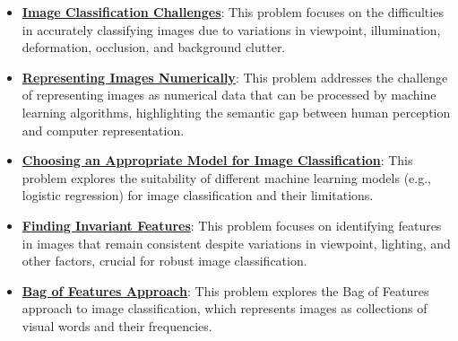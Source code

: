 \documentclass{article}%
\begin{document}
\begin{itemize}[leftmargin=*]%
\item \href{https://purdue.brightspace.com/d2l/common/assets/pdfjs-d2l-dist/1.0.14-legacy/web/viewer.html?file=\%2Fcontent\%2Fenforced\%2F1095467-wl.202510.CS.24300.001\%2F07L2-Vision.pdf\%3Fou\%3D1095467\&lang=en-us\&container=d2l-fileviewer-rendered-pdf\&fullscreen=d2l-fileviewer-rendered-pdf-dialog\&height=667#page=4}{\textbf{Image Classification Challenges}}: This problem focuses on the difficulties in accurately classifying images due to variations in viewpoint, illumination, deformation, occlusion, and background clutter.%
\item \href{https://purdue.brightspace.com/d2l/common/assets/pdfjs-d2l-dist/1.0.14-legacy/web/viewer.html?file=\%2Fcontent\%2Fenforced\%2F1095467-wl.202510.CS.24300.001\%2F07L2-Vision.pdf\%3Fou\%3D1095467\&lang=en-us\&container=d2l-fileviewer-rendered-pdf\&fullscreen=d2l-fileviewer-rendered-pdf-dialog\&height=667#page=4}{\textbf{Representing Images Numerically}}: This problem addresses the challenge of representing images as numerical data that can be processed by machine learning algorithms, highlighting the semantic gap between human perception and computer representation.%
\item \href{https://purdue.brightspace.com/d2l/common/assets/pdfjs-d2l-dist/1.0.14-legacy/web/viewer.html?file=\%2Fcontent\%2Fenforced\%2F1095467-wl.202510.CS.24300.001\%2F07L2-Vision.pdf\%3Fou\%3D1095467\&lang=en-us\&container=d2l-fileviewer-rendered-pdf\&fullscreen=d2l-fileviewer-rendered-pdf-dialog\&height=667#page=5}{\textbf{Choosing an Appropriate Model for Image Classification}}: This problem explores the suitability of different machine learning models (e.g., logistic regression) for image classification and their limitations.%
\item \href{https://purdue.brightspace.com/d2l/common/assets/pdfjs-d2l-dist/1.0.14-legacy/web/viewer.html?file=\%2Fcontent\%2Fenforced\%2F1095467-wl.202510.CS.24300.001\%2F07L2-Vision.pdf\%3Fou\%3D1095467\&lang=en-us\&container=d2l-fileviewer-rendered-pdf\&fullscreen=d2l-fileviewer-rendered-pdf-dialog\&height=667#page=11}{\textbf{Finding Invariant Features}}: This problem focuses on identifying features in images that remain consistent despite variations in viewpoint, lighting, and other factors, crucial for robust image classification.%
\item \href{https://purdue.brightspace.com/d2l/common/assets/pdfjs-d2l-dist/1.0.14-legacy/web/viewer.html?file=\%2Fcontent\%2Fenforced\%2F1095467-wl.202510.CS.24300.001\%2F07L2-Vision.pdf\%3Fou\%3D1095467\&lang=en-us\&container=d2l-fileviewer-rendered-pdf\&fullscreen=d2l-fileviewer-rendered-pdf-dialog\&height=667#page=12}{\textbf{Bag of Features Approach}}: This problem explores the Bag of Features approach to image classification, which represents images as collections of visual words and their frequencies.%

\end{itemize}
\end{document}
